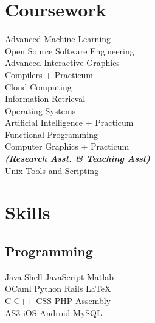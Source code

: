 \documentclass[]{deedy-resume-openfont}
\begin{document}
\begin{minipage}[t]{0.33\textwidth}
\section{Coursework}
    Advanced Machine Learning \\
    Open Source Software Engineering \\
    Advanced Interactive Graphics \\
    Compilers + Practicum \\
    Cloud Computing \\
    Information Retrieval \\
    Operating Systems \\
    Artificial Intelligence + Practicum \\
    Functional Programming \\
    Computer Graphics + Practicum \\
    {\footnotesize \textit{\textbf{(Research Asst. \& Teaching Asst) }}} \\
    Unix Tools and Scripting \\
\sectionsep


\section{Skills}
\subsection{Programming}
Java \textbullet{}   Shell \textbullet{} JavaScript \textbullet{} Matlab \\
OCaml \textbullet{} Python \textbullet{} Rails \textbullet{} \LaTeX\ \\ 
C \textbullet{} C++ \textbullet{} CSS \textbullet{} PHP \textbullet{} Assembly \\
AS3 \textbullet{} iOS \textbullet{} Android \textbullet{} MySQL
\sectionsep


\end{minipage}
\hfill
\end{document}
